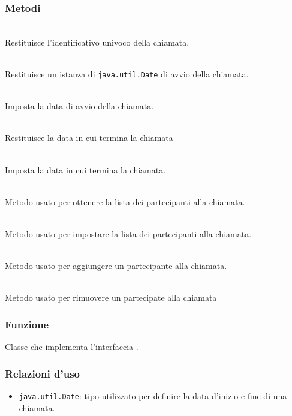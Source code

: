 \subsubsection*{Metodi}
\begin{description}
	\item{}\\
	Restituisce l'identificativo univoco della chiamata.
	\item{}\\
	Restituisce un istanza di \texttt{java.util.Date} di avvio della chiamata.
	\item{}\\
	Imposta la data di avvio della chiamata.
	\item{}\\
	Restituisce la data in cui termina la chiamata
	\item{}\\
	Imposta la data in cui termina la chiamata.
	\item{}\\
	Metodo usato per ottenere la lista dei partecipanti alla chiamata.
	\item{}\\
	Metodo usato per impostare la lista dei partecipanti alla chiamata.
	\item{}\\
	Metodo usato per aggiungere un partecipante alla chiamata.
	\item{}\\
	Metodo usato per rimuovere un partecipate alla chiamata 
\end{description}


\subsubsection*{Funzione}
Classe che implementa l'interfaccia .

\subsubsection*{Relazioni d'uso}
\begin{itemize}
	\item \texttt{java.util.Date}: tipo utilizzato per definire la data d'inizio e fine di una chiamata.
\end{itemize}

